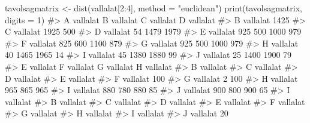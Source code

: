 \documentclass[
  letterpaper,
]{krantz}
\makeatletter
\newenvironment{Shaded}{\begin{snugshade}}{\end{snugshade}}
\newcommand{\AttributeTok}[1]{\textcolor[rgb]{0.40,0.45,0.13}{#1}}
\newcommand{\CommentTok}[1]{\textcolor[rgb]{0.37,0.37,0.37}{#1}}
\newcommand{\DecValTok}[1]{\textcolor[rgb]{0.68,0.00,0.00}{#1}}
\newcommand{\FunctionTok}[1]{\textcolor[rgb]{0.28,0.35,0.67}{#1}}
\newcommand{\NormalTok}[1]{\textcolor[rgb]{0.00,0.23,0.31}{#1}}
\newcommand{\OtherTok}[1]{\textcolor[rgb]{0.00,0.23,0.31}{#1}}
\newcommand{\SpecialCharTok}[1]{\textcolor[rgb]{0.37,0.37,0.37}{#1}}
\newcommand{\StringTok}[1]{\textcolor[rgb]{0.13,0.47,0.30}{#1}}
\newenvironment{kframe}{%
\medskip{}
\setlength{\fboxsep}{.8em}
 \def\at@end@of@kframe{}%
 \ifinner\ifhmode%
  \def\at@end@of@kframe{\end{minipage}}%
  \begin{minipage}{\columnwidth}%
 \fi\fi%
 \def\FrameCommand##1{\hskip\@totalleftmargin \hskip-\fboxsep
 \colorbox{shadecolor}{##1}\hskip-\fboxsep
     \hskip-\linewidth \hskip-\@totalleftmargin \hskip\columnwidth}%
 \MakeFramed {\advance\hsize-\width
   \@totalleftmargin\z@ \linewidth\hsize
   \@setminipage}}%
 {\par\unskip\endMakeFramed%
 \at@end@of@kframe}
\renewenvironment{Shaded}{\begin{kframe}}{\end{kframe}}
\makeatother
\begin{document}
\begin{Shaded}
\begin{Highlighting}[]
\NormalTok{tavolsagmatrix }\OtherTok{\textless{}{-}} \FunctionTok{dist}\NormalTok{(vallalat[}\DecValTok{2}\SpecialCharTok{:}\DecValTok{4}\NormalTok{], }\AttributeTok{method =} \StringTok{"euclidean"}\NormalTok{)}
\FunctionTok{print}\NormalTok{(tavolsagmatrix, }\AttributeTok{digits =} \DecValTok{1}\NormalTok{)}
\CommentTok{\#\textgreater{}            A vallalat B vallalat C vallalat D vallalat}
\CommentTok{\#\textgreater{} B vallalat       1425                                 }
\CommentTok{\#\textgreater{} C vallalat       1925        500                      }
\CommentTok{\#\textgreater{} D vallalat         54       1479       1979           }
\CommentTok{\#\textgreater{} E vallalat        925        500       1000        979}
\CommentTok{\#\textgreater{} F vallalat        825        600       1100        879}
\CommentTok{\#\textgreater{} G vallalat        925        500       1000        979}
\CommentTok{\#\textgreater{} H vallalat         40       1465       1965         14}
\CommentTok{\#\textgreater{} I vallalat         45       1380       1880         99}
\CommentTok{\#\textgreater{} J vallalat         25       1400       1900         79}
\CommentTok{\#\textgreater{}            E vallalat F vallalat G vallalat H vallalat}
\CommentTok{\#\textgreater{} B vallalat                                            }
\CommentTok{\#\textgreater{} C vallalat                                            }
\CommentTok{\#\textgreater{} D vallalat                                            }
\CommentTok{\#\textgreater{} E vallalat                                            }
\CommentTok{\#\textgreater{} F vallalat        100                                 }
\CommentTok{\#\textgreater{} G vallalat          2        100                      }
\CommentTok{\#\textgreater{} H vallalat        965        865        965           }
\CommentTok{\#\textgreater{} I vallalat        880        780        880         85}
\CommentTok{\#\textgreater{} J vallalat        900        800        900         65}
\CommentTok{\#\textgreater{}            I vallalat}
\CommentTok{\#\textgreater{} B vallalat           }
\CommentTok{\#\textgreater{} C vallalat           }
\CommentTok{\#\textgreater{} D vallalat           }
\CommentTok{\#\textgreater{} E vallalat           }
\CommentTok{\#\textgreater{} F vallalat           }
\CommentTok{\#\textgreater{} G vallalat           }
\CommentTok{\#\textgreater{} H vallalat           }
\CommentTok{\#\textgreater{} I vallalat           }
\CommentTok{\#\textgreater{} J vallalat         20}
\end{Highlighting}
\end{Shaded}
\end{document}

